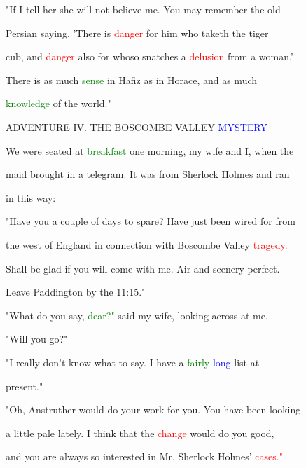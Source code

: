  "If I tell her she will not believe me. You may remember the old

 Persian saying, 'There is \textcolor{red}{danger} for him who taketh the tiger

 cub, and \textcolor{red}{danger} also for whoso snatches a \textcolor{red}{delusion} from a woman.'

 There is as much \textcolor{green}{sense} in Hafiz as in Horace, and as much

 \textcolor{green}{knowledge} of the world."







 \textcolor{BurntOrange}{ADVENTURE} IV. THE BOSCOMBE VALLEY \textcolor{blue}{MYSTERY}



 We were seated at \textcolor{green}{breakfast} one morning, my wife and I, when the

 maid brought in a telegram. It was from Sherlock Holmes and ran

 in this way:



 "Have you a couple of days to spare? Have just been wired for from

 the west of England in connection with Boscombe Valley \textcolor{red}{tragedy.}

 Shall be \textcolor{BurntOrange}{glad} if you will come with me. Air and scenery \textcolor{BurntOrange}{perfect.}

 \textcolor{BurntOrange}{Leave} Paddington by the 11:15."



 "What do you say, \textcolor{green}{dear?"} said my wife, looking across at me.

 "Will you go?"



 "I really don't know what to say. I have a \textcolor{green}{fairly} \textcolor{blue}{long} list at

 \textcolor{BurntOrange}{present."}



 "Oh, Anstruther would do your work for you. You have been looking

 a little pale lately. I think that the \textcolor{red}{change} would do you \textcolor{BurntOrange}{good,}

 and you are always so \textcolor{BurntOrange}{interested} in Mr. Sherlock Holmes' \textcolor{red}{cases."}



